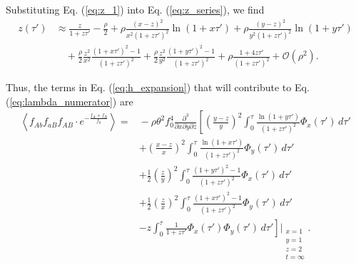 \documentclass[11pt]{article}
\begin{document}
Substituting Eq. (\ref{eq:z_1}) into Eq. (\ref{eq:z_series}), we find
\begin{align}
    z(\tau') &\approx \frac{z}{1+z\tau'} 
    - \frac{\rho}{2}
    + \rho\frac{(x-z)^2}{x^2(1+z\tau')^2}\ln(1+x\tau')
    + \rho\frac{(y-z)^2}{y^2(1+z\tau')^2}\ln(1+y\tau') \\\nonumber
    &\quad + \frac{\rho}{2}\frac{z^2}{x^2}\frac{(1+x\tau')^2-1}{(1+z\tau')^2}
    + \frac{\rho}{2}\frac{z^2}{y^2}\frac{(1+y\tau')^2-1}{(1+z\tau')^2}
    + \rho\frac{1+4z\tau'}{(1+z\tau')^2} + \mathcal{O}(\rho^2).
\end{align}

Thus, the terms in Eq. (\ref{eq:h_expansion}) that will contribute to Eq. (\ref{eq:lambda_numerator}) are 
\begin{align}
    \left\langle f_{Ab}f_{aB}f_{AB}\cdot e^{-\frac{f_{A}+f_{B}}{f_0}}\right\rangle =&{} -\rho \theta^2 f_0^4 \frac{\partial^3}{\partial x \partial y \partial z} \left[ \left(\frac{y-z}{y}\right)^2 \int_0^{\tau} \frac{\ln(1+y\tau')}{(1+z\tau')^2} \Phi_x(\tau') \,d\tau' \right. \\\nonumber
    &+ \left. \left(\frac{x-z}{x}\right)^2 \int_0^{\tau} \frac{\ln(1+x\tau')}{(1+z\tau')^2} \Phi_y(\tau') \,d\tau' \right. \\\nonumber
    &+ \left. \frac{1}{2} \left(\frac{z}{y}\right)^2 \int_0^{\tau}  \frac{(1+y\tau')^2-1}{(1+z\tau')^2}\Phi_x(\tau') \,d\tau' \right. \\\nonumber
    &+ \left. \frac{1}{2} \left(\frac{z}{x}\right)^2 \int_0^{\tau} \frac{(1+x\tau')^2-1}{(1+z\tau')^2}\Phi_y(\tau') \,d\tau' \right. \\\nonumber
    &- \left.  z\int_0^{\tau} \frac{1}{1+z\tau'} \Phi_x(\tau')\Phi_y(\tau') \,d\tau'\right]\Bigg\vert_{\substack{x=1 \\ y=1 \\ z=2 \\ t=\infty}}.

\end{align}
\end{document}
